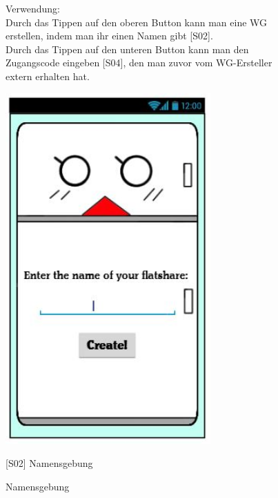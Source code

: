 \documentclass[a4paper]{scrreprt}
\begin{document}
\begin{figure}[h]
\begin{minipage}[b]{0.55\linewidth}
        		Verwendung:\\
        		Durch das Tippen auf den oberen Button
        		kann man eine WG erstellen, indem man ihr
        		einen Namen gibt {[}S02{]}.\\
        		Durch das Tippen auf den unteren Button kann
        		man den Zugangscode eingeben {[}S04{]}, den man zuvor vom WG-Ersteller extern erhalten 
        		hat.
        		
        	\end{minipage}
        \end{figure}
    
    	\begin{figure}[h!]
    		\begin{minipage}[t]{0.4\linewidth}
    			\flushright
    			\centering
    			\vspace{9mm}
    			\includegraphics[width=0.7\textwidth]{fridget_nameenter.JPG}
    			\caption{Namensgebung}
    			\label{fig:figure1}
    		\end{minipage}
    		\hspace{0.5cm}
    		\begin{minipage}[t]{0.55\linewidth}
    			\flushleft
    			\vspace{9mm}
    			{[}S02{]} Namensgebung\\
    			

\end{minipage}
\end{figure}
\end{document}

